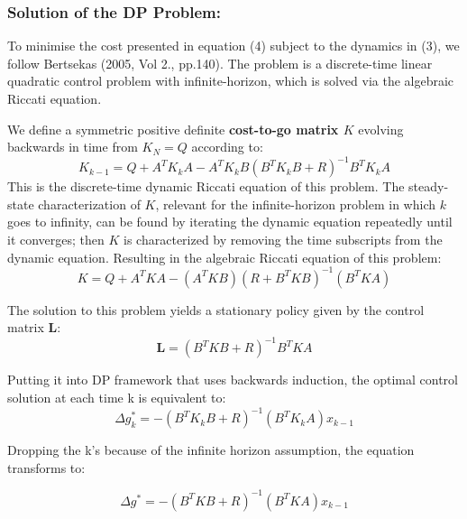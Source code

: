 \documentclass[11pt]{article}
\begin{document}
\subsubsection*{Solution of the DP Problem:}
To minimise the cost presented in equation (4) subject to the dynamics in (3), we follow Bertsekas (2005, Vol 2., pp.140). The problem is a discrete-time linear quadratic control problem with infinite-horizon, which is solved via the algebraic Riccati equation. 

We define a symmetric positive definite \textbf{cost-to-go matrix $K$} evolving backwards in time from $K _ { N } = Q$ according to:
\begin{equation} 
K _ { k - 1 } = Q + A ^ { T } K_ { k } A - A ^ { T } K _ { k } B \left( B ^ { T } K_ { k } B + R \right) ^ { - 1 } B ^ { T } K _ { k } A
\end{equation}
This is the discrete-time dynamic Riccati equation of this problem. The steady-state characterization of $K$, relevant for the infinite-horizon problem in which $k$ goes to infinity, can be found by iterating the dynamic equation repeatedly until it converges; then $K$ is characterized by removing the time subscripts from the dynamic equation. Resulting in the algebraic Riccati equation of this problem:
\begin{equation}
K = Q+ A ^ { T } K A - \left( A ^ { T } K B \right) \left( R + B ^ { T } K B \right) ^ { - 1 } \left( B ^ { T } K A \right)
\end{equation}

The solution to this problem yields a stationary policy given by the control matrix $\mathbf{L}$:
\begin{equation}
\mathbf{L} = \left(B ^ { T } K B +R \right) ^ { - 1 } B ^ { T } K A 
\end{equation}

Putting it into DP framework that uses backwards induction, the optimal control solution at each time k is equivalent to:
\begin{equation} 
\Delta g _ { k } ^ { * } = - \left( B ^ { T } K _ { k } B + R \right) ^ { - 1 } \left( B ^ { T } K _ { k } A \right) x _ { k - 1 }
\end{equation}

Dropping the k's because of the infinite horizon assumption, the equation transforms to:

\begin{equation} 
\Delta g  ^ { * } = - \left( B ^ { T } K  B + R \right) ^ { - 1 } \left( B ^ { T } K  A \right) x _ { k - 1 }
\end{equation}
\end{document}
